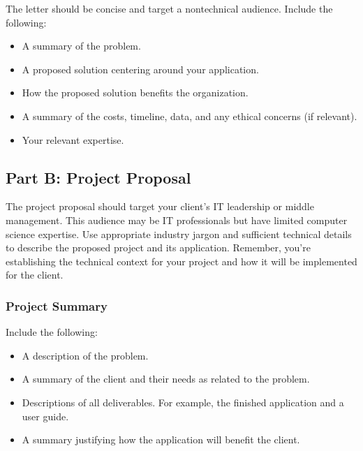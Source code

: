 \documentclass[letterpaper,10pt,english]{jupyterBook}
\begin{document}
\sphinxAtStartPar
The letter should be concise and target a non\sphinxhyphen{}technical audience. Include the following:
\begin{itemize}
\item {} 
\sphinxAtStartPar
A summary of the problem.

\item {} 
\sphinxAtStartPar
A proposed solution centering around your application.

\item {} 
\sphinxAtStartPar
How the proposed solution benefits the organization.

\item {} 
\sphinxAtStartPar
A summary of the costs, timeline, data, and any ethical concerns (if relevant).

\item {} 
\sphinxAtStartPar
Your relevant expertise.

\end{itemize}


\subsection{Part B: Project Proposal}
\label{\detokenize{task2_doc/task2_doc_a_and_b:part-b-project-proposal}}
\sphinxAtStartPar
The project proposal should target your client’s IT leadership or middle management. This audience may be IT professionals but have limited computer science expertise. Use appropriate industry jargon and sufficient technical details to describe the proposed project and its application. Remember, you’re establishing the technical context for your project and how it will be implemented for the client. 


\subsubsection{Project Summary}
\label{\detokenize{task2_doc/task2_doc_a_and_b:project-summary}}
\sphinxAtStartPar
Include the following:
\begin{itemize}
\item {} 
\sphinxAtStartPar
A description of the problem.

\item {} 
\sphinxAtStartPar
A summary of the client and their needs as related to the problem.

\item {} 
\sphinxAtStartPar
Descriptions of all deliverables. For example, the finished application and a user guide.

\item {} 
\sphinxAtStartPar
A summary justifying how the application will benefit the client.

\end{itemize}
\end{document}
